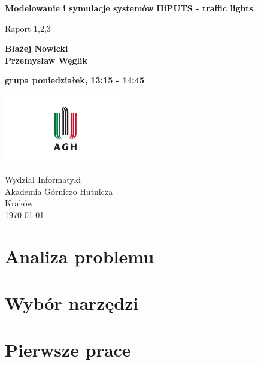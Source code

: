 \documentclass[a4paper]{article}
\begin{document}
\begin{titlepage}
    \begin{center}
        \vspace*{1cm}

        \Huge
        \textbf{Modelowanie i symulacje systemów}
        \textbf{HiPUTS - traffic lights}

        \Large
        \vspace{0.5cm}
        Raport 1,2,3

        \vspace{1.5cm}

        \textbf{
        Błażej Nowicki \\
        Przemysław Węglik \\
        }
        

        \vspace{1.8cm}

        \textbf{
        grupa poniedziałek, 13:15 - 14:45
        }

        \vfill
        \vspace{0.8cm}

        \includegraphics[width=0.4\textwidth]{./imgs/agh_logo.jpg}

        Wydział Informatyki\\
        Akademia Górniczo Hutnicza\\
        Kraków\\
        \today

    \end{center}
\end{titlepage}

\section{Analiza problemu}


\section{Wybór narzędzi}


\section{Pierwsze prace}
\end{document}
